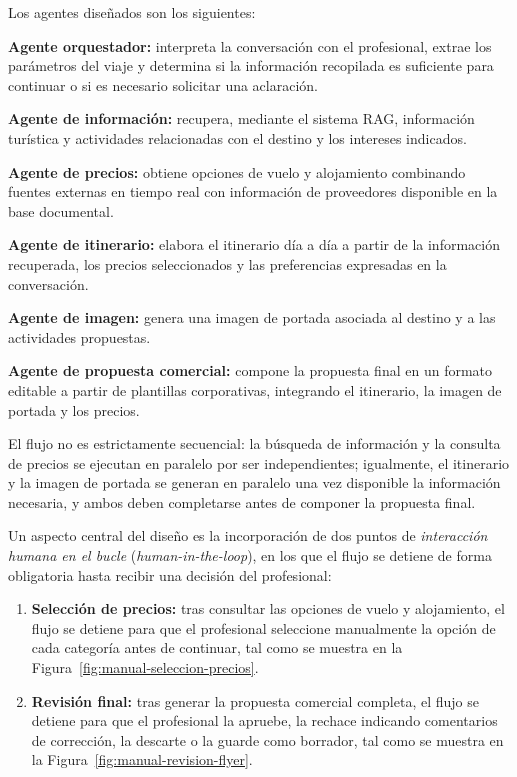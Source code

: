 Los agentes diseñados son los siguientes:

\begin{tfmbullets}
\item \textbf{Agente orquestador:} interpreta la conversación con el profesional, extrae los parámetros del viaje y determina si la información recopilada es suficiente para continuar o si es necesario solicitar una aclaración.
\item \textbf{Agente de información:} recupera, mediante el sistema RAG, información turística y actividades relacionadas con el destino y los intereses indicados.
\item \textbf{Agente de precios:} obtiene opciones de vuelo y alojamiento combinando fuentes externas en tiempo real con información de proveedores disponible en la base documental.
\item \textbf{Agente de itinerario:} elabora el itinerario día a día a partir de la información recuperada, los precios seleccionados y las preferencias expresadas en la conversación.
\item \textbf{Agente de imagen:} genera una imagen de portada asociada al destino y a las actividades propuestas.
\item \textbf{Agente de propuesta comercial:} compone la propuesta final en un formato editable a partir de plantillas corporativas, integrando el itinerario, la imagen de portada y los precios.
\end{tfmbullets}

El flujo no es estrictamente secuencial: la búsqueda de información y la consulta de precios se ejecutan en paralelo por ser independientes; igualmente, el itinerario y la imagen de portada se generan en paralelo una vez disponible la información necesaria, y ambos deben completarse antes de componer la propuesta final.

Un aspecto central del diseño es la incorporación de dos puntos de \emph{interacción humana en el bucle} (\textit{human-in-the-loop}), en los que el flujo se detiene de forma obligatoria hasta recibir una decisión del profesional:

\begin{enumerate}
\item \textbf{Selección de precios:} tras consultar las opciones de vuelo y alojamiento, el flujo se detiene para que el profesional seleccione manualmente la opción de cada categoría antes de continuar, tal como se muestra en la Figura~\ref{fig:manual-seleccion-precios}.
\item \textbf{Revisión final:} tras generar la propuesta comercial completa, el flujo se detiene para que el profesional la apruebe, la rechace indicando comentarios de corrección, la descarte o la guarde como borrador, tal como se muestra en la Figura~\ref{fig:manual-revision-flyer}.
\end{enumerate}


